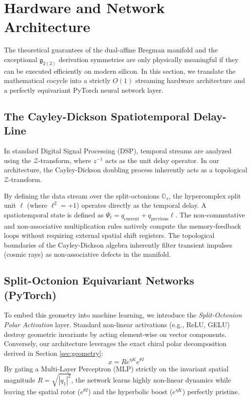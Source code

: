 \section{Hardware and Network Architecture}
\label{sec:architecture}

The theoretical guarantees of the dual-affine Bregman manifold and the exceptional $\mathfrak{g}_{2(2)}$ derivation symmetries are only physically meaningful if they can be executed efficiently on modern silicon. In this section, we translate the mathematical cocycle into a strictly $O(1)$ streaming hardware architecture and a perfectly equivariant PyTorch neural network layer.

\subsection{The Cayley-Dickson Spatiotemporal Delay-Line}
In standard Digital Signal Processing (DSP), temporal streams are analyzed using the $\mathcal{Z}$-transform, where $z^{-1}$ acts as the unit delay operator. In our architecture, the Cayley-Dickson doubling process inherently acts as a topological $\mathcal{Z}$-transform. 

By defining the data stream over the split-octonions $\mathbb{O}_s$, the hypercomplex split unit $\ell$ (where $\ell^2 = +1$) operates directly as the temporal delay. A spatiotemporal state is defined as $\Psi_t = q_{\text{current}} + q_{\text{previous}}\ell$. The non-commutative and non-associative multiplication rules natively compute the memory-feedback loops without requiring external spatial shift registers. The topological boundaries of the Cayley-Dickson algebra inherently filter transient impulses (cosmic rays) as non-associative defects in the manifold.

\subsection{Split-Octonion Equivariant Networks (PyTorch)}
To embed this geometry into machine learning, we introduce the \textit{Split-Octonion Polar Activation} layer. Standard non-linear activations (e.g., ReLU, GELU) destroy geometric invariants by acting element-wise on vector components. Conversely, our architecture leverages the exact chiral polar decomposition derived in Section \ref{sec:geometry}:
\begin{equation}
    x = R e^{\eta K} e^{\theta I}
\end{equation}
By gating a Multi-Layer Perceptron (MLP) strictly on the invariant spatial magnitude $R = \sqrt{|q_1|^2}$, the network learns highly non-linear dynamics while leaving the spatial rotor ($e^{\theta I}$) and the hyperbolic boost ($e^{\eta K}$) perfectly pristine. 

